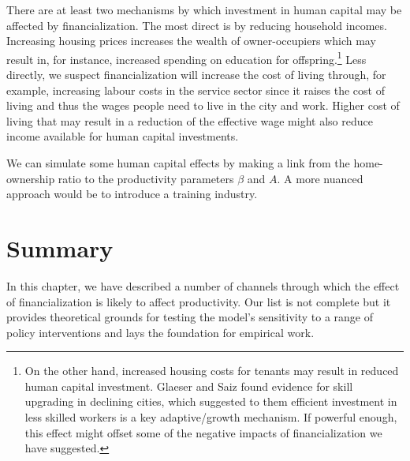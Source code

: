 There are at least two mechanisms by which investment in human capital may be affected by financialization. The most direct is by reducing household incomes. Increasing housing prices increases the wealth of owner-occupiers which may result in, for instance, increased spending on education for offspring.\footnote{On the other hand, increased housing costs for tenants may result in reduced human capital investment. Glaeser and Saiz found evidence for skill upgrading in declining cities, which suggested to them efficient investment in less skilled workers is a key adaptive/growth mechanism. If powerful enough, this effect might offset some of the negative impacts of financialization we have suggested.} %
Less directly, we suspect financialization will increase the cost of living through, for example, increasing labour costs in the service sector since it raises the cost of living and thus the wages people need to live in the city and work. Higher cost of living that may result in a reduction of the effective wage might also reduce income available for human capital investments. %

We can simulate some human capital effects by making a link from the home-ownership ratio to the productivity parameters  $\beta$ and $A$. A more nuanced approach would be to introduce a training industry. %

\section{Summary}
In this chapter, we have described a number of channels through which the effect of financialization is likely to affect productivity. %
Our list is not complete but it provides theoretical grounds for testing the model's sensitivity to a range of policy interventions and lays the foundation for empirical work.  

